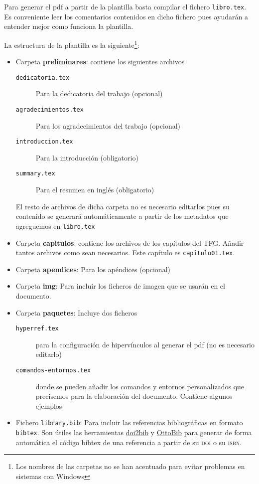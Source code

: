 Para generar el pdf a partir de la plantilla basta compilar el fichero \texttt{libro.tex}. Es conveniente leer los comentarios contenidos en dicho fichero pues ayudarán a entender mejor como funciona la plantilla.

La estructura de la plantilla es la siguiente\footnote{Los nombres de las carpetas no se han acentuado para evitar problemas en sistemas con Windows}:
\begin{itemize}
  \item Carpeta \textbf{preliminares}: contiene los siguientes archivos
    \begin{description}
      \item[\texttt{dedicatoria.tex}] Para la dedicatoria del trabajo (opcional)
      \item[\texttt{agradecimientos.tex}] Para los agradecimientos del trabajo (opcional)
      \item[\texttt{introduccion.tex}] Para la introducción (obligatorio)
      \item[\texttt{summary.tex}] Para el resumen en inglés (obligatorio)
  \end{description}
  El resto de archivos de dicha carpeta no es necesario editarlos pues su contenido se generará automáticamente a partir de los metadatos que agreguemos en \texttt{libro.tex}

  \item Carpeta \textbf{capitulos}: contiene los archivos de los capítulos del TFG. Añadir tantos archivos como sean necesarios. Este capítulo es \texttt{capitulo01.tex}.

  \item Carpeta \textbf{apendices}: Para los apéndices (opcional)
  \item Carpeta \textbf{img}: Para incluir los ficheros de imagen que se usarán en el documento.
  \item Carpeta \textbf{paquetes}: Incluye dos ficheros
    \begin{description}
      \item[\texttt{hyperref.tex}] para la configuración de hipervínculos al generar el pdf (no es necesario editarlo)
      \item[\texttt{comandos-entornos.tex}] donde se pueden añadir los comandos y entornos personalizados que precisemos para la elaboración del documento. Contiene algunos ejemplos
    \end{description}

  \item Fichero \texttt{library.bib}: Para incluir las referencias bibliográficas en formato \texttt{bibtex}. Son útiles las herramientas \href{https://www.doi2bib.org/}{doi2bib} y \href{https://www.ottobib.com/}{OttoBib} para generar de forma automática el código bibtex de una referencia a partir de su \textsc{doi} o su \textsc{isbn}.


\end{itemize}
